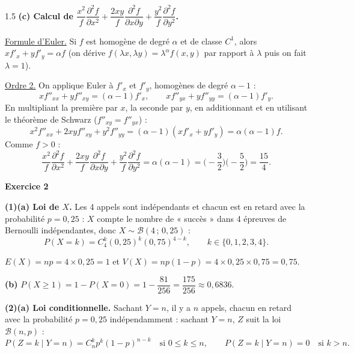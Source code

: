 \documentclass[12pt]{article}
\begin{document}
\begin{spacing}{1.5}
\textbf{(c) Calcul de $\dfrac{x^2}{f}\dfrac{\partial^2f}{\partial x^2}+\dfrac{2xy}{f}\dfrac{\partial^2f}{\partial x\partial y}+\dfrac{y^2}{f}\dfrac{\partial^2f}{\partial y^2}$.}

\underline{Formule d'Euler.} Si $f$ est homogène de degré $\alpha$ et de classe $C^1$, alors $xf'_x+yf'_y=\alpha f$ (on dérive $f(\lambda x,\lambda y)=\lambda^\alpha f(x,y)$ par rapport à $\lambda$ puis on fait $\lambda=1$).

\underline{Ordre 2.} On applique Euler à $f'_x$ et $f'_y$, homogènes de degré $\alpha-1$ :
\[
xf''_{xx}+yf''_{xy}=(\alpha-1)f'_x,\qquad xf''_{yx}+yf''_{yy}=(\alpha-1)f'_y .
\]
En multipliant la première par $x$, la seconde par $y$, en additionnant et en utilisant le théorème de Schwarz ($f''_{xy}=f''_{yx}$) :
\[
x^2f''_{xx}+2xyf''_{xy}+y^2f''_{yy}=(\alpha-1)(xf'_x+yf'_y)=\alpha(\alpha-1)f .
\]
Comme $f>0$ :
\[
\frac{x^2}{f}\frac{\partial^2f}{\partial x^2}+\frac{2xy}{f}\frac{\partial^2f}{\partial x\partial y}+\frac{y^2}{f}\frac{\partial^2f}{\partial y^2}=\alpha(\alpha-1)=\Big(-\frac32\Big)\Big(-\frac52\Big)=\boxed{\frac{15}{4}}.
\]

\medskip\textbf{Exercice 2}

\textbf{(1)(a) Loi de $X$.} Les 4 appels sont indépendants et chacun est en retard avec la probabilité $p=0{,}25$ : $X$ compte le nombre de « succès » dans 4 épreuves de Bernoulli indépendantes, donc \textbf{$X\sim\mathcal{B}(4\,;\,0{,}25)$} :
\[
P(X=k)=C_4^k(0{,}25)^k(0{,}75)^{4-k},\qquad k\in\{0,1,2,3,4\}.
\]
\begin{center}
\end{center}
$E(X)=np=4\times0{,}25=\boxed{1}$ \quad et \quad $V(X)=np(1-p)=4\times0{,}25\times0{,}75=\boxed{0{,}75}$.

\textbf{(b)} $P(X\ge1)=1-P(X=0)=1-\dfrac{81}{256}=\dfrac{175}{256}\approx\boxed{0{,}6836}$.

\textbf{(2)(a) Loi conditionnelle.} Sachant $Y=n$, il y a $n$ appels, chacun en retard avec la probabilité $p=0{,}25$ indépendamment : sachant $Y=n$, $Z$ suit la loi $\mathcal{B}(n,p)$ :
\[
P(Z=k\mid Y=n)=C_n^kp^k(1-p)^{n-k}\quad\text{si }0\le k\le n,\qquad P(Z=k\mid Y=n)=0\quad\text{si }k>n .
\]


\end{spacing}
\end{document}
